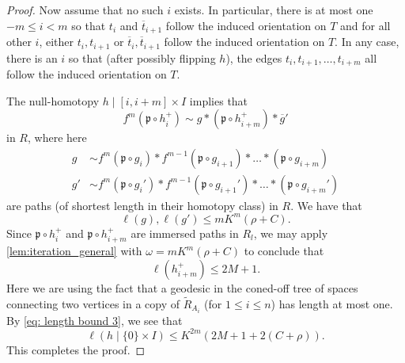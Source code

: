 \documentclass[10pt,a4paper]{amsart}
\DeclareMathOperator{\len}{\ell}
\begin{document}
\begin{proof}
Now assume that no such $i$ exists. In particular, there is at most one $-m\leqslant i< m$ so that $t_i$ and $\overline{t}_{i+1}$ follow the induced orientation on $T$ and for all other $i$, either $t_i, t_{i+1}$ or $\overline{t}_i, \overline{t}_{i+1}$ follow the induced orientation on $T$. In any case, there is an $i$ so that (after possibly flipping $h$), the edges $t_i, t_{i+1}, \ldots, t_{i+m}$ all follow the induced orientation on $T$.

The null-homotopy $h\mid[i, i+m]\times I$ implies that
\[
f^m(\mathfrak{p}\circ h_i^+) \sim g*(\mathfrak{p}\circ h_{i+m}^+)*\overline{g}'
\]
in $R$, where here
\begin{align*}
g &\sim f^m(\mathfrak{p}\circ g_{i})*f^{m-1}(\mathfrak{p}\circ g_{i+1})*\ldots *(\mathfrak{p}\circ g_{i+m})\\
g' &\sim f^m(\mathfrak{p}\circ g_i')*f^{m-1}(\mathfrak{p}\circ g_{i+1}')*\ldots *(\mathfrak{p}\circ g_{i+m}')
\end{align*}
are paths (of shortest length in their homotopy class) in $R$. We have that
\[
\len(g), \len(g') \leqslant mK^m(\rho+C).
\]
Since $\mathfrak{p}\circ h_i^+$ and $\mathfrak{p}\circ h_{i+m}^+$ are immersed paths in $R_{l}$, we may apply \cref{lem:iteration_general} with $\omega = mK^m(\rho+C)$ to conclude that 
\[
\len(h_{i+m}^+)\leqslant 2M + 1.
\]
Here we are using the fact that a geodesic in the coned-off tree of spaces connecting two vertices in a copy of $\widetilde{R}_{A_i}$ (for $1\leqslant i\leqslant n$) has length at most one. By \eqref{eq: length bound 3}, we see that
\[
\len(h\mid \{0\}\times I)\leqslant K^{2m}(2M+1 + 2(C+\rho)). 
\]
This completes the proof.
\end{proof}
\end{document}
